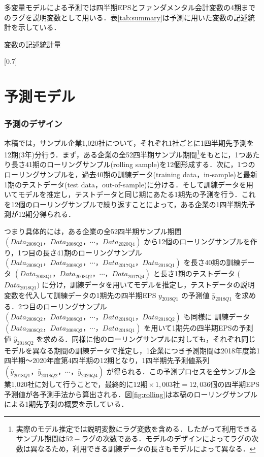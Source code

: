 \documentclass[a4paper，12pt]{jsarticle}
\begin{document}
多変量モデルによる予測では四半期EPSとファンダメンタル会計変数の4期までのラグを説明変数として用いる．表\ref{tab:summary}は予測に用いた変数の記述統計を示している．

\begin{table}
  \centering
  \caption{変数の記述統計量}
  \label{tab:summary}
  \scalebox{0.7}[0.7]{
    
  }
\end{table}

    
\part{予測モデル} \label{par:model}

\section{予測のデザイン}

本稿では，サンプル企業1,020社について，それぞれ1社ごとに1四半期先予測を12期(3年)分行う．まず，ある企業の全52四半期サンプル期間\footnote{実際のモデル推定では説明変数にラグ変数を含める．したがって利用できるサンプル期間は$52 - ラグの次数 $である．モデルのデザインによってラグの次数は異なるため，利用できる訓練データの長さもモデルによって異なる．}をもとに，1つあたり長さ41期のローリングサンプル(rolling sample)を12個形成する．次に，1つのローリングサンプルを，過去40期の訓練データ(training data，in-sample)と最新1期のテストデータ(test data，out-of-sample)に分ける．そして訓練データを用いてモデルを推定し，テストデータと同じ期にあたる1期先の予測を行う．これを12個のローリングサンプルで繰り返すことによって，ある企業の1四半期先予測が12期分得られる．

つまり具体的には，ある企業の全52四半期サンプル期間 $(Data_{\text{2008Q1}}，Data_{\text{2008Q2}}，\cdots，Data_{\text{2020Q4}})$ から12個のローリングサンプルを作り，1つ目の長さ41期のローリングサンプル $(Data_{\text{2008Q1}}，Data_{\text{2008Q2}}，\cdots，Data_{\text{2017Q4}}，Data_{\text{2018Q1}})$ を長さ40期の訓練データ $(Data_{\text{2008Q1}}，Data_{\text{2008Q2}}，\cdots，Data_{\text{2017Q4}})$ と長さ1期のテストデータ ($Data_{\text{2018Q1}})$ に分け，訓練データを用いてモデルを推定し，テストデータの説明変数を代入して訓練データの1期先の四半期EPS $y_{2018Q1}$ の予測値 $\hat{y}_{2018Q1}$ を求める．2つ目のローリングサンプル $(Data_{\text{2008Q2}}，Data_{\text{2008Q3}}，\cdots，Data_{\text{2018Q1}}，Data_{\text{2018Q2}})$ も同様に 訓練データ $(Data_{\text{2008Q2}}，Data_{\text{2008Q3}}，\cdots，Data_{\text{2018Q1}})$ を用いて1期先の四半期EPSの予測値 $\hat{y}_{2018Q2}$ を求める．同様に他のローリングサンプルに対しても，それぞれ同じモデルを異なる期間の訓練データで推定し，1企業につき予測期間は2018年度第1四半期～2020年度第4四半期の12期となり，1四半期先予測値系列 $(\hat{y}_{2018Q1}，\hat{y}_{2018Q2}，\cdots，\hat{y}_{2020Q4})$ が得られる．この予測プロセスを全サンプル企業1,020社に対して行うことで，最終的に$12期 \times 1,003社 = 12,036個$の四半期EPS予測値が各予測手法から算出される．図\ref{fig:rolling}は本稿のローリングサンプルによる1期先予測の概要を示している．
\end{document}
